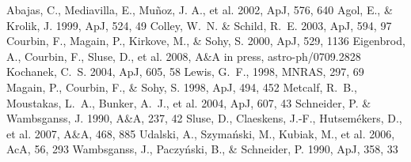 \documentclass{PoS}
\begin{document}
\begin{thebibliography}{99}

       Abajas, C., Mediavilla, E., Mu\~noz, J. A., et al. 2002, ApJ, 576, 640
	      Agol, E., \& Krolik, J. 1999, ApJ, 524, 49
       Colley, W.~N. \& Schild, R.~E. 2003, ApJ, 594, 97
	Courbin, F., Magain, P., Kirkove, M., \& Sohy, S. 2000, ApJ, 529, 1136
  Eigenbrod, A., Courbin, F., Sluse, D., et al. 2008, A\&A in press, astro-ph/0709.2828
     Kochanek, C.~S.  2004, ApJ, 605, 58
     Lewis, G.~F., 1998, MNRAS, 297, 69
	Magain, P., Courbin, F., \& Sohy, S. 1998, ApJ, 494, 452
        Metcalf, R.~B., Moustakas, L.~A., Bunker, A.~J., et al. 2004, ApJ, 607, 43
    Schneider, P. \& Wambsganss, J. 1990, A\&A, 237, 42
        Sluse, D., Claeskens, J.-F., Hutsem\'ekers, D., et al. 2007, A\&A, 468, 885
      Udalski, A., Szyma\'nski, M., Kubiak, M., et al. 2006, AcA, 56, 293
   Wambsganss, J., Paczy\'nski, B., \& Schneider, P. 1990, ApJ, 358, 33


\end{thebibliography}
\end{document}
